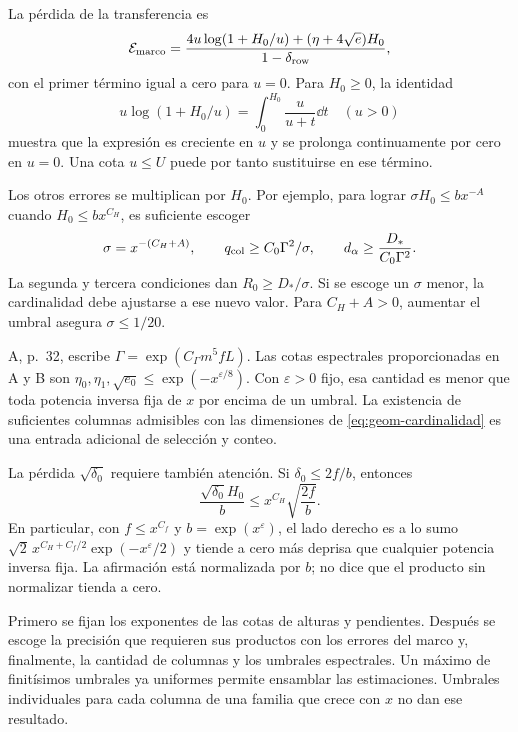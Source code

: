 La pérdida de la transferencia es
\begin{equation}
 \mathcal E_{\rm marco}
 =\frac{4u\log(1+H_0/u)+(\eta+4\sqrt e)H_0}
        {1-\delta_{\rm row}},
 \label{eq:geom-presupuesto-marco}
\end{equation}
con el primer término igual a cero para $u=0$.
Para $H_0\ge0$, la identidad
\[
 u\log(1+H_0/u)=\int_0^{H_0}\frac{u}{u+t}\dd t
 \quad(u>0)
\]
muestra que la expresión es creciente en $u$ y se prolonga
continuamente por cero en $u=0$.
Una cota $u\le U$ puede por tanto sustituirse en ese término.

Los otros errores se multiplican por $H_0$.
Por ejemplo, para lograr
$\sigma H_0\le bx^{-A}$ cuando $H_0\le bx^{C_H}$,
es suficiente escoger
\begin{equation}
 \sigma=x^{-(C_H+A)},\qquad
 q_{\rm col}\ge C_0\Gamma^2/\sigma,
 \qquad
 d_\alpha\ge\frac{D_*}{C_0\Gamma^2}.
 \label{eq:geom-cardinalidad}
\end{equation}
La segunda y tercera condiciones dan
$R_0\ge D_*/\sigma$.
Si se escoge un $\sigma$ menor, la cardinalidad debe ajustarse
a ese nuevo valor.
Para $C_H+A>0$, aumentar el umbral asegura $\sigma\le1/20$.

A, p.~32, escribe $\Gamma=\exp(C_\Gamma m^5fL)$.
Las cotas espectrales proporcionadas en A y B son
$\eta_0,\eta_1,\sqrt{e_0}\le\exp(-x^{\varepsilon/8})$.
Con $\varepsilon>0$ fijo, esa cantidad es menor que toda
potencia inversa fija de $x$ por encima de un umbral.
La existencia de suficientes columnas admisibles con las
dimensiones de \eqref{eq:geom-cardinalidad} es una entrada
adicional de selección y conteo.

La pérdida $\sqrt{\delta_0}$ requiere también atención.
Si $\delta_0\le2f/b$, entonces
\[
 \frac{\sqrt{\delta_0}H_0}{b}
       \le x^{C_H}\sqrt{\frac{2f}{b}}.
\]
En particular, con $f\le x^{C_f}$ y $b=\exp(x^\varepsilon)$,
el lado derecho es a lo sumo
$\sqrt2\,x^{C_H+C_f/2}\exp(-x^\varepsilon/2)$
y tiende a cero más deprisa que cualquier potencia inversa fija.
La afirmación está normalizada por $b$; no dice que el
producto sin normalizar tienda a cero.

Primero se fijan los exponentes de las cotas de alturas y
pendientes. Después se escoge la precisión que requieren
sus productos con los errores del marco y, finalmente,
la cantidad de columnas y los umbrales espectrales.
Un máximo de finitísimos umbrales ya uniformes permite
ensamblar las estimaciones. Umbrales individuales para cada
columna de una familia que crece con $x$ no dan ese resultado.

